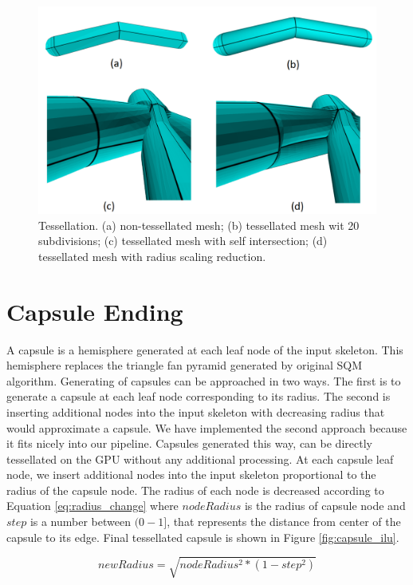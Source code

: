 \begin{figure}[ht]
    \centering
    \includegraphics[width=0.9\linewidth]{images/tess_ilu}
    \caption[Tessellation and smoothing]{Tessellation. (a) non-tessellated mesh; (b) tessellated mesh wit 20 subdivisions; (c) tessellated mesh with self intersection; (d) tessellated mesh with radius scaling reduction.}
    \label{fig:tessellation_ilu}
\end{figure}

\section{Capsule Ending}
A capsule is a hemisphere generated at each leaf node of the input skeleton.
This hemisphere replaces the triangle fan pyramid generated by original SQM algorithm.
Generating of capsules can be approached in two ways.
The first is to generate a capsule at each leaf node corresponding to its radius.
The second is inserting additional nodes into the input skeleton with decreasing radius that would approximate a capsule.
We have implemented the second approach because it fits nicely into our pipeline.
Capsules generated this way, can be directly tessellated on the GPU without any additional processing.
At each capsule leaf node, we insert additional nodes into the input skeleton proportional to the radius of the capsule node.
The radius of each node is decreased according to Equation \ref{eq:radius_change} where $nodeRadius$ is the radius of capsule node and $step$ is a number between $(0-1]$, that represents the distance from center of the capsule to its edge.
Final tessellated capsule is shown in Figure \ref{fig:capsule_ilu}.

\begin{equation}
newRadius = \sqrt{nodeRadius^{2} * (1 - step^{2})}
\label{eq:radius_change}
\end{equation}

